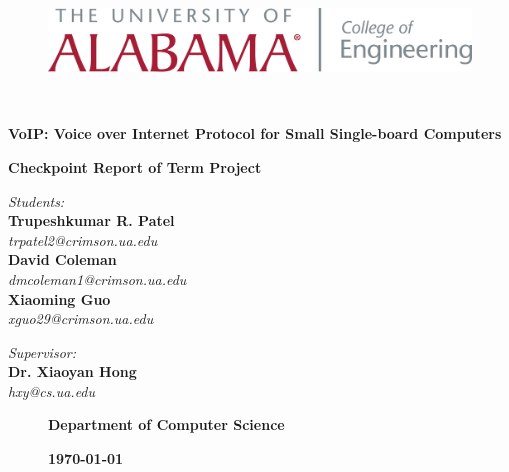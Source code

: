 \begin{titlepage}
	\begin{figure}[t]
		\begin{minipage}{\textwidth}
			\centering
			\includegraphics[scale=0.35]{Images/UA/OfficLogo-Engineering.png}
		\end{minipage}
	\end{figure}

	\quad\\
	\vspace{0.5in}
	\centering
	\begin{spacing}{2.0}
		{ \textbf{\LARGE VoIP: Voice over Internet Protocol for Small Single-board Computers}}
	\end{spacing}
	
	\vspace{1.5in}
	\textbf{\Large Checkpoint Report of Term Project}
	\vspace{3.0in}

	\begin{minipage}{0.49\textwidth}
		\begin{flushleft}
			\textit{{Students:}} \\
			{\textbf{Trupeshkumar R. Patel}}\\
			\textsl{trpatel2@crimson.ua.edu}\\
			{\textbf{David Coleman}}\\
			\textsl{dmcoleman1@crimson.ua.edu}\\
			{\textbf{Xiaoming Guo}}\\
			\textsl{xguo29@crimson.ua.edu}
		\end{flushleft}
	\end{minipage}
	\begin{minipage}{0.5\textwidth}
		\begin{flushright}
			\textit{{Supervisor:}} \\
			{\textbf{Dr. Xiaoyan Hong}}\\
			\textsl{hxy@cs.ua.edu}
		\end{flushright}
	\end{minipage}

	\begin{figure}[b]
		\begin{minipage}{0.55\textwidth}
			\begin{flushleft}
				\textbf{\large Department of Computer Science}
			\end{flushleft}
		\end{minipage}
		\hfill
		\begin{minipage}{0.35\textwidth}
			\begin{flushright}
				\textsc{\textbf{\today}}
			\end{flushright}
		\end{minipage}
	\end{figure}

\end{titlepage}